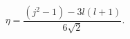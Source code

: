 \begin{equation} \label{eta-definition}
\eta = \frac{(j^2 - 1) - 3l(l+1)}{6 \sqrt{2}}.
\end{equation}

